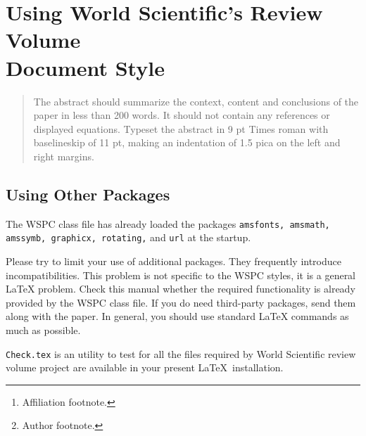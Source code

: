 \documentclass{ws-rv961x669}
\begin{document}
\chapter[Using World Scientific's Review Volume Document Style]{Using World Scientific's Review Volume\\ Document Style}\label{ra_ch1}

\author[F. Author and S. Author]{First Author and Second Author\footnote{Author footnote.}}

\address{World Scientific Publishing Co, Production Department,\\
5 Toh Tuck Link, Singapore 596224, \\
f\_author@wspc.com.sg\footnote{Affiliation footnote.}}

\begin{abstract}
The abstract should summarize the context, content and conclusions of
the paper in less than 200 words. It should not contain any references
or displayed equations. Typeset the abstract in 9 pt Times roman with
baselineskip of 11 pt, making an indentation of 1.5 pica on the left
and right margins.
\end{abstract}


\body


\section{Using Other Packages}\label{ra_sec1}
The WSPC class file has already loaded the packages
\verb|amsfonts, amsmath,| \verb|amssymb, graphicx, rotating,| and \verb|url|
at the startup.

Please try to limit your use of additional packages. They
frequently introduce incompatibilities. This problem is not
specific to the WSPC styles, it is a general \LaTeX{} problem.
Check this manual whether the required functionality is already
provided by the WSPC class file. If you do need third-party
packages, send them along with the paper. In general, you should
use standard \LaTeX{} commands as much as possible.

\verb|Check.tex| is an utility to test for
all the files required by World Scientific review volume project
are available in your present \LaTeX\ installation.
\end{document}
